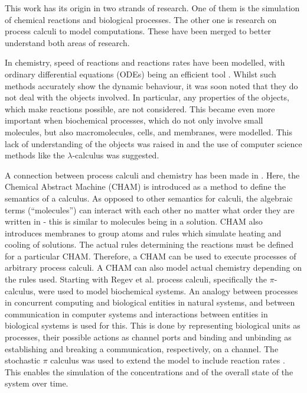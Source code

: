 This work has its origin in two strands of research. One of them is the simulation of chemical reactions and biological processes. The other one is research on process calculi to model computations. These have been merged  to better understand both areas of research.

In chemistry, speed of reactions and reactions rates have been modelled, with ordinary differential equations (ODEs) being an efficient tool \cite{higham}. Whilst such methods accurately show the dynamic behaviour, it was soon noted that they do not deal with the objects involved. In particular, any properties of the objects, which make reactions possible, are not considered. This became even more important when biochemical processes, which do not only involve small molecules, but also macromolecules, cells, and membranes, were modelled. This lack of understanding of the objects was raised in \cite{fontana} and the use of computer science methods like the $\lambda$-calculus was suggested.

A connection between process calculi and chemistry has been made in \cite{chamjournal}. Here, the Chemical Abstract Machine (CHAM) is introduced as a method to define the semantics of a calculus. As opposed to other semantics for calculi, the algebraic terms (“molecules”) can interact with each other no matter what order they are written in - this is similar to molecules being in a solution. CHAM also introduces membranes to group atoms and rules which simulate heating and cooling of solutions. The actual rules determining the reactions must be defined for a particular CHAM. Therefore, a CHAM can be used to execute processes of arbitrary process calculi. A CHAM can also model actual chemistry depending on the rules used. Starting with Regev et al. \cite{regev2000} process calculi, specifically the $\pi$-calculus, were used to model biochemical systems. An analogy between processes in concurrent computing and biological entities in natural systems, and between communication in computer systems and interactions between entities in biological systems is used for this. This is done by representing biological units as processes, their possible actions as channel ports and binding and unbinding as establishing and breaking a communication, respectively, on a channel. The stochastic $\pi$ calculus \cite{PriamiStochasticPi} was used to extend the model to include reaction rates \cite{PriameRegev}. This enables the simulation of the concentrations and of the overall state of the system over time.

